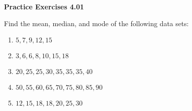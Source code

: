\vspace{0.3ex}
\noindent\textbf{Practice Exercises 4.01}

\vspace{0.2ex}

Find the mean, median, and mode of the following data sets:  
\begin{multicols}{2}
\begin{enumerate}
    \item \( 5, 7, 9, 12, 15 \)
    \item \( 3, 6, 6, 8, 10, 15, 18 \)
    \item \( 20, 25, 25, 30, 35, 35, 35, 40 \)
    \item \( 50, 55, 60, 65, 70, 75, 80, 85, 90 \)
    \item \( 12, 15, 18, 18, 20, 25, 30 \)
\end{enumerate}
\end{multicols}
